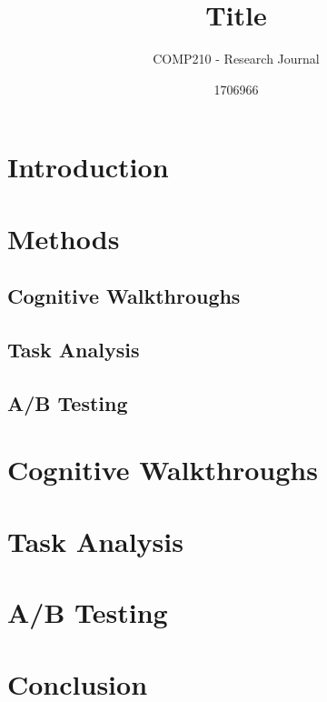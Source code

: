 \documentclass{scrartcl}
\title{Title}
\subtitle{COMP210 - Research Journal}
\author{1706966}
\begin{document}
	
	\maketitle
	
	\abstract{}
	
	\section{Introduction}

	\section{Methods}

	\subsection{Cognitive Walkthroughs}

	\subsection{Task Analysis}
	
	\subsection{A/B Testing}

	\section{Cognitive Walkthroughs}
	
	\section{Task Analysis}
	
	\section{A/B Testing}

	\section{Conclusion}

	
	
	
	
\end{document}
